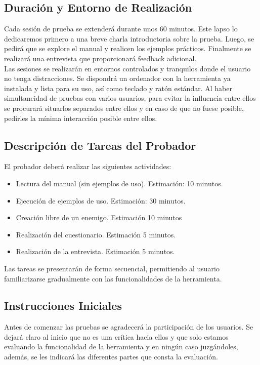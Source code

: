 \subsection{Duración y Entorno de Realización}
Cada sesión de prueba se extenderá durante unos 60 minutos. Este lapso lo dedicaremos primero a una breve charla introductoria sobre la prueba. Luego, se pedirá que se explore el manual y realicen los ejemplos prácticos. Finalmente se realizará una entrevista que proporcionará feedback adicional.\\

Las sesiones se realizarán en entornos controlados y tranquilos donde el usuario no tenga distracciones. Se dispondrá un ordenador con la herramienta ya instalada y lista para su uso, así como teclado y ratón estándar. Al haber simultaneidad de pruebas con varios usuarios, para evitar la influencia entre ellos se procurará situarlos separados entre ellos y en caso de que no fuese posible, pedirles la mínima interacción posible entre ellos.

\subsection{Descripción de Tareas del Probador}
El probador deberá realizar las siguientes actividades:

\begin{itemize}
\item Lectura del manual (sin ejemplos de uso). Estimación: 10 minutos.
\item Ejecución de ejemplos de uso. Estimación: 30 minutos.
\item Creación libre de un enemigo. Estimación 10 minutos
\item Realización del cuestionario. Estimación 5 minutos.
\item Realización de la entrevista. Estimación 5 minutos.
\end{itemize}

Las tareas se presentarán de forma secuencial, permitiendo al usuario familiarizarse gradualmente con las funcionalidades de la herramienta. 

\subsection{Instrucciones Iniciales}

Antes de comenzar las pruebas se agradecerá la participación de los usuarios. Se dejará claro al inicio que no es una crítica hacia ellos y que solo estamos evaluando la funcionalidad de la herramienta y en ningún caso juzgándoles, además, se les indicará las diferentes partes que consta la evaluación.\\

